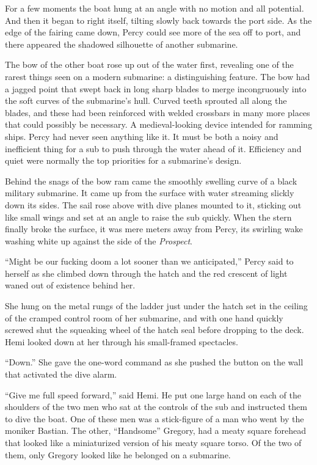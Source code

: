 \documentclass[
]{scrbook}
\begin{document}
For a few moments the boat hung at an angle with no motion and all
potential. And then it began to right itself, tilting slowly back
towards the port side. As the edge of the fairing came down, Percy could
see more of the sea off to port, and there appeared the shadowed
silhouette of another submarine.

The bow of the other boat rose up out of the water first, revealing one
of the rarest things seen on a modern submarine: a distinguishing
feature. The bow had a jagged point that swept back in long sharp blades
to merge incongruously into the soft curves of the submarine's hull.
Curved teeth sprouted all along the blades, and these had been
reinforced with welded crossbars in many more places that could possibly
be necessary. A medieval-looking device intended for ramming ships.
Percy had never seen anything like it. It must be both a noisy and
inefficient thing for a sub to push through the water ahead of it.
Efficiency and quiet were normally the top priorities for a submarine's
design.

Behind the snags of the bow ram came the smoothly swelling curve of a
black military submarine. It came up from the surface with water
streaming slickly down its sides. The sail rose above with dive planes
mounted to it, sticking out like small wings and set at an angle to
raise the sub quickly. When the stern finally broke the surface, it was
mere meters away from Percy, its swirling wake washing white up against
the side of the \emph{Prospect}.

``Might be our fucking doom a lot sooner than we anticipated,'' Percy
said to herself as she climbed down through the hatch and the red
crescent of light waned out of existence behind her.

\bigskip

She hung on the metal rungs of the ladder just under the hatch set in
the ceiling of the cramped control room of her submarine, and with one
hand quickly screwed shut the squeaking wheel of the hatch seal before
dropping to the deck. Hemi looked down at her through his small-framed
spectacles.

``Down.'' She gave the one-word command as she pushed the button on the
wall that activated the dive alarm.

``Give me full speed forward,'' said Hemi. He put one large hand on each
of the shoulders of the two men who sat at the controls of the sub and
instructed them to dive the boat. One of these men was a stick-figure of
a man who went by the moniker Bastian. The other, ``Handsome'' Gregory,
had a meaty square forehead that looked like a miniaturized version of
his meaty square torso. Of the two of them, only Gregory looked like he
belonged on a submarine.
\end{document}
